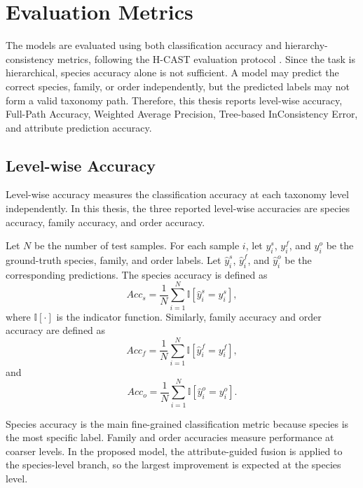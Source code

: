 \section{Evaluation Metrics}

The models are evaluated using both classification accuracy and hierarchy-consistency metrics, following the H-CAST evaluation protocol \cite{park2025visually}. Since the task is hierarchical, species accuracy alone is not sufficient. A model may predict the correct species, family, or order independently, but the predicted labels may not form a valid taxonomy path. Therefore, this thesis reports level-wise accuracy, Full-Path Accuracy, Weighted Average Precision, Tree-based InConsistency Error, and attribute prediction accuracy.

\subsection{Level-wise Accuracy}

Level-wise accuracy measures the classification accuracy at each taxonomy level independently. In this thesis, the three reported level-wise accuracies are species accuracy, family accuracy, and order accuracy.

Let \(N\) be the number of test samples. For each sample \(i\), let \(y_i^{s}\), \(y_i^{f}\), and \(y_i^{o}\) be the ground-truth species, family, and order labels. Let \(\hat{y}_i^{s}\), \(\hat{y}_i^{f}\), and \(\hat{y}_i^{o}\) be the corresponding predictions. The species accuracy is defined as
\begin{equation}
    Acc_s =
    \frac{1}{N}
    \sum_{i=1}^{N}
    \mathbb{I}
    \left[
        \hat{y}_i^{s} = y_i^{s}
    \right],
\end{equation}
where \(\mathbb{I}[\cdot]\) is the indicator function. Similarly, family accuracy and order accuracy are defined as
\begin{equation}
    Acc_f =
    \frac{1}{N}
    \sum_{i=1}^{N}
    \mathbb{I}
    \left[
        \hat{y}_i^{f} = y_i^{f}
    \right],
\end{equation}
and
\begin{equation}
    Acc_o =
    \frac{1}{N}
    \sum_{i=1}^{N}
    \mathbb{I}
    \left[
        \hat{y}_i^{o} = y_i^{o}
    \right].
\end{equation}

Species accuracy is the main fine-grained classification metric because species is the most specific label. Family and order accuracies measure performance at coarser levels. In the proposed model, the attribute-guided fusion is applied to the species-level branch, so the largest improvement is expected at the species level.

